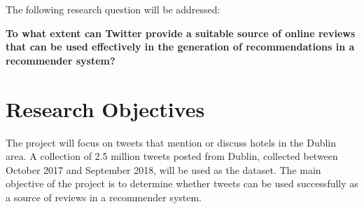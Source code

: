 The following research question will be addressed:
\begin{center}
\textbf{To what extent can Twitter provide a suitable source of online reviews that can be used effectively in the generation of recommendations in a recommender system?}
\end{center}

\section{Research Objectives}
The project will focus on tweets that mention or discuss hotels in the Dublin area. A collection of 2.5 million tweets posted from Dublin, collected between October 2017 and September 2018, will be used as the dataset. The main objective of the project is to determine whether tweets can be used successfully as a source of reviews in a recommender system.

